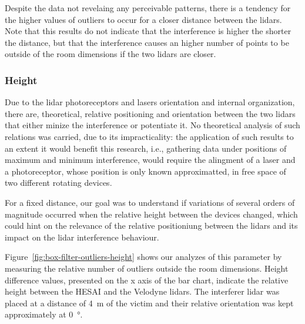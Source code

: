 Despite the data not revelaing any perceivable patterns, there is a tendency for the higher values of outliers to occur for a closer distance between the \acp{lidar}. Note that this results do not indicate that the interference is higher the shorter the distance, but that the interference causes an higher number of points to be outside of the room dimensions if the two \acp{lidar} are closer. 

\subsubsection{Height}
Due to the \ac{lidar} photoreceptors and lasers orientation and internal organization, there are, theoretical, relative positioning and orientation between the two \acp{lidar} that either minize the interference or potentiate it. No theoretical analysis of such relations was carried, due to its impracticality: the application of such results to an extent it would benefit this research, i.e., gathering data under positions of maximum and minimum interference,  would require the alingment of a laser and a photoreceptor, whose position is only known approximatted, in free space of two different rotating devices.

For a fixed distance, our goal was to understand if variations of several orders of magnitude occurred when the relative height between the devices changed, which could hint on the relevance of the relative positioniung between the \acp{lidar} and its impact on the \ac{lidar} interference behaviour.

Figure~\ref{fig:box-filter-outliers-height} shows our analyzes of this parameter by measuring the relative number of outliers outside the room dimensions. Height difference values, presented on the x axis of the bar chart, indicate the relative height between the HESAI and the Velodyne \acp{lidar}. The interferer \ac{lidar} was placed at a distance of \SI{4}{\meter} of the victim and their relative orientation was kept approximately at \SI{0}{\degree}.

